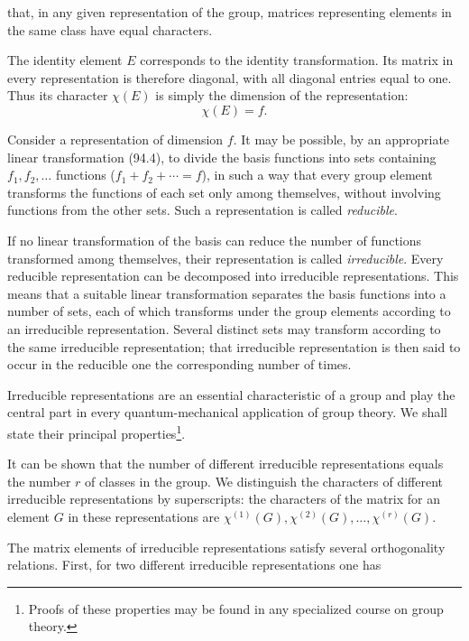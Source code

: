 that, in any given representation of the group, matrices representing elements in the same class have equal characters.

The identity element $E$ corresponds to the identity transformation. Its matrix in every representation is therefore diagonal, with all diagonal entries equal to one. Thus its character $\chi(E)$ is simply the dimension of the representation:
\begin{equation}
 \chi(E)=f.
 \tag{94.6}
\end{equation}

Consider a representation of dimension $f$. It may be possible, by an appropriate linear transformation (94.4), to divide the basis functions into sets containing $f_1,f_2,\ldots$ functions ($f_1+f_2+\cdots=f$), in such a way that every group element transforms the functions of each set only among themselves, without involving functions from the other sets. Such a representation is called \emph{reducible}.

If no linear transformation of the basis can reduce the number of functions transformed among themselves, their representation is called \emph{irreducible}. Every reducible representation can be decomposed into irreducible representations. This means that a suitable linear transformation separates the basis functions into a number of sets, each of which transforms under the group elements according to an irreducible representation. Several distinct sets may transform according to the same irreducible representation; that irreducible representation is then said to occur in the reducible one the corresponding number of times.

Irreducible representations are an essential characteristic of a group and play the central part in every quantum-mechanical application of group theory. We shall state their principal properties\footnote{Proofs of these properties may be found in any specialized course on group theory.}.

It can be shown that the number of different irreducible representations equals the number $r$ of classes in the group. We distinguish the characters of different irreducible representations by superscripts: the characters of the matrix for an element $G$ in these representations are $\chi^{(1)}(G),\chi^{(2)}(G),\ldots,\chi^{(r)}(G)$.

The matrix elements of irreducible representations satisfy several orthogonality relations. First, for two different irreducible representations one has

